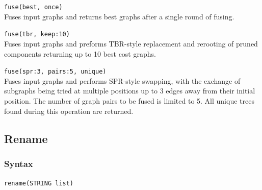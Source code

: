 	\begin{example}
		\item{\texttt{fuse(best, once)}\\Fuses input graphs and returns best graphs after a single round of 
		fusing.}
		
		\item{\texttt{fuse(tbr, keep:10)} \\Fuses input graphs and preforms TBR-style replacement and 
		rerooting of pruned components returning up to 10 best cost graphs.}
		
		\item{\texttt{fuse(spr:3, pairs:5, unique)} \\Fuses input graphs and performs SPR-style swapping, 
		with the exchange of subgraphs being tried at multiple positions up to 3 edges away from their 
		initial position. The number of graph pairs to be fused is limited to 5. All unique trees found
		during this operation are returned.}
	\end{example}
\subsection{Rename}
	\label{subsec:Rename}
	\subsubsection{Syntax}
		\texttt{rename(STRING list)}
		

